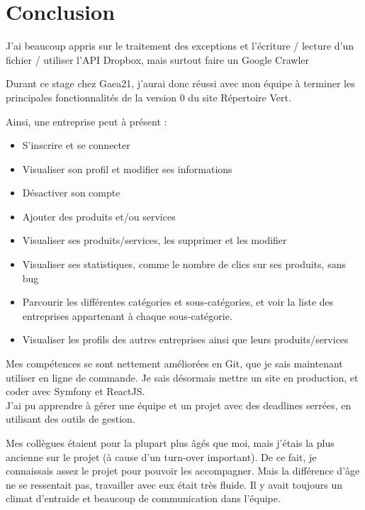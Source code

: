 \section*{Conclusion} 
{}
\thispagestyle{noTitledHeader}

J’ai beaucoup appris sur le traitement des exceptions et l’écriture / lecture d’un fichier / utiliser l'API Dropbox, mais surtout faire un Google Crawler

Durant ce stage chez Gaea21, j'aurai donc réussi avec mon équipe à terminer les principales fonctionnalités de la version 0 du site Répertoire Vert.

Ainsi, une entreprise peut à présent :
\begin{itemize}
    \item S'inscrire et se connecter
    \item Visualiser son profil et modifier ses informations
    \item Désactiver son compte
    \item Ajouter des produits et/ou services
    \item Visualiser ses produits/services, les supprimer et les modifier
    \item Visualiser ses statistiques, comme le nombre de clics sur ses produits, sans bug
    \item Parcourir les différentes catégories et sous-catégories, et voir la liste des entreprises appartenant à chaque sous-catégorie.
    \item Visualiser les profils des autres entreprises ainsi que leurs produits/services
\end{itemize}

Mes compétences se sont nettement améliorées en Git, que je sais maintenant utiliser en ligne de commande.
Je sais désormais mettre un site en production, et coder avec Symfony et ReactJS.\\

J'ai pu apprendre à gérer une équipe et un projet avec des deadlines serrées, en utilisant des outils de gestion. 

Mes collègues étaient pour la plupart plus âgés que moi, mais j'étais la plus ancienne sur le projet (à cause d'un turn-over important). 
De ce fait, je connaissais assez le projet pour pouvoir les accompagner. Mais la différence d'âge ne se ressentait pas, travailler avec eux était très fluide.
Il y avait toujours un climat d'entraide et beaucoup de communication dans l'équipe.

